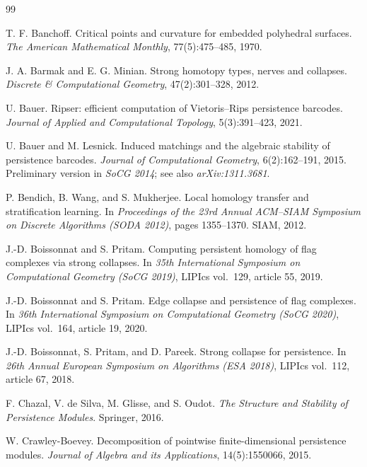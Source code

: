 \documentclass[11pt,letterpaper]{article}
\theoremstyle{definition}
\begin{document}
\begin{thebibliography}{99}

T. F. Banchoff.
\newblock Critical points and curvature for embedded polyhedral surfaces.
\newblock \emph{The American Mathematical Monthly}, 77(5):475--485, 1970.

J. A. Barmak and E. G. Minian.
\newblock Strong homotopy types, nerves and collapses.
\newblock \emph{Discrete \& Computational Geometry}, 47(2):301--328, 2012.

U. Bauer.
\newblock Ripser: efficient computation of Vietoris--Rips persistence barcodes.
\newblock \emph{Journal of Applied and Computational Topology}, 5(3):391--423, 2021.

U. Bauer and M. Lesnick.
\newblock Induced matchings and the algebraic stability of persistence barcodes.
\newblock \emph{Journal of Computational Geometry}, 6(2):162--191, 2015.
\newblock Preliminary version in \emph{SoCG 2014}; see also \emph{arXiv:1311.3681}.

P. Bendich, B. Wang, and S. Mukherjee.
\newblock Local homology transfer and stratification learning.
\newblock In \emph{Proceedings of the 23rd Annual ACM--SIAM Symposium on Discrete Algorithms (SODA 2012)}, pages 1355--1370. SIAM, 2012.

J.-D. Boissonnat and S. Pritam.
\newblock Computing persistent homology of flag complexes via strong collapses.
\newblock In \emph{35th International Symposium on Computational Geometry (SoCG 2019)}, LIPIcs vol.\ 129, article 55, 2019.

J.-D. Boissonnat and S. Pritam.
\newblock Edge collapse and persistence of flag complexes.
\newblock In \emph{36th International Symposium on Computational Geometry (SoCG 2020)}, LIPIcs vol.\ 164, article 19, 2020.

J.-D. Boissonnat, S. Pritam, and D. Pareek.
\newblock Strong collapse for persistence.
\newblock In \emph{26th Annual European Symposium on Algorithms (ESA 2018)}, LIPIcs vol.\ 112, article 67, 2018.

F. Chazal, V. de Silva, M. Glisse, and S. Oudot.
\newblock \emph{The Structure and Stability of Persistence Modules}.
\newblock Springer, 2016.

W. Crawley-Boevey.
\newblock Decomposition of pointwise finite-dimensional persistence modules.
\newblock \emph{Journal of Algebra and its Applications}, 14(5):1550066, 2015.


\end{thebibliography}
\end{document}
